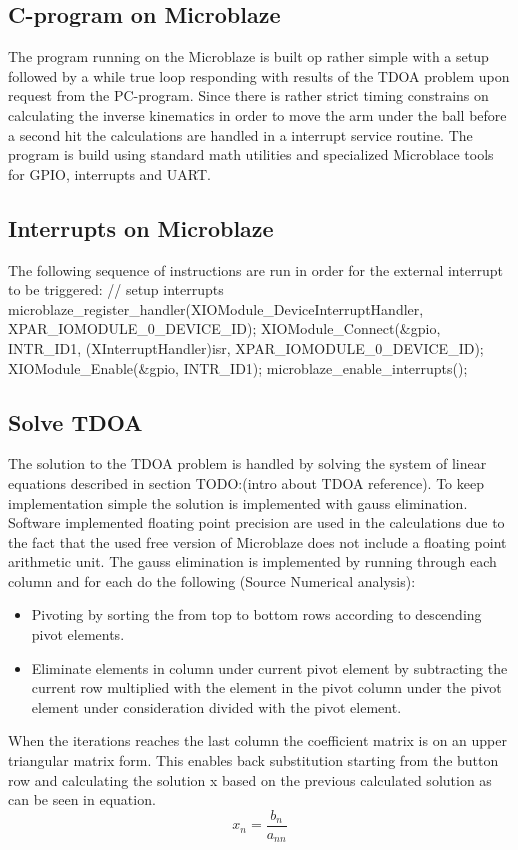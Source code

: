 \subsection{C-program on Microblaze}
The program running on the Microblaze is built op rather simple with a setup followed by a while true loop responding with results of the TDOA problem upon request from the PC-program. Since there is rather strict timing constrains on calculating the inverse kinematics in order to move the arm under the ball before a second hit the calculations are handled in a interrupt service routine. The program is build using standard math utilities and specialized Microblace tools for GPIO, interrupts and UART.

\subsection{Interrupts on Microblaze}
The following sequence of instructions are run in order for the external interrupt to be triggered:  
// setup interrupts
microblaze_register_handler(XIOModule_DeviceInterruptHandler, XPAR_IOMODULE_0_DEVICE_ID);
XIOModule_Connect(&gpio, INTR_ID1, (XInterruptHandler)isr, XPAR_IOMODULE_0_DEVICE_ID);
XIOModule_Enable(&gpio, INTR_ID1);
microblaze_enable_interrupts();


\subsection{Solve TDOA}
The solution to the TDOA problem is handled by solving the system of linear equations described in section TODO:(intro about TDOA reference). To keep implementation simple the solution is implemented with gauss elimination. Software implemented floating point precision are used in the calculations due to the fact that the used free version of Microblaze does not include a floating point arithmetic unit. 
The gauss elimination is implemented by running through each column and for each do the following (Source Numerical analysis):
\begin{itemize}
	\item Pivoting by sorting the from top to bottom rows according to descending pivot elements.
	\item Eliminate elements in column under current pivot element by subtracting the current row multiplied with the element in the pivot column under the pivot element under consideration divided with the pivot element.
\end{itemize}
When the iterations reaches the last column the coefficient matrix is on an upper triangular matrix form. This enables back substitution starting from the button row and calculating the solution x based on the previous calculated solution as can be seen in equation.
\begin{equation}
	x_n = \frac{b_n}{a_{nn}}
\end{equation}


